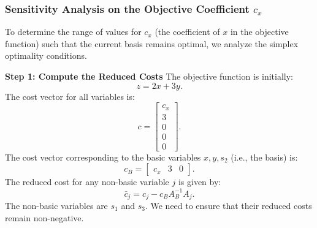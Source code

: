 \subsubsection{Sensitivity Analysis on the Objective Coefficient \(c_x\)}

To determine the range of values for \( c_x \) (the coefficient of \( x \) in the objective function) such that the current basis remains optimal, we analyze the simplex optimality conditions.

\textbf{Step 1: Compute the Reduced Costs}
The objective function is initially:
\[
    z = 2x + 3y.
\]
The cost vector for all variables is:
\[
    c = \begin{bmatrix} c_x \\ 3 \\ 0 \\ 0 \\ 0 \end{bmatrix}.
\]
The cost vector corresponding to the basic variables \( x, y, s_2 \) (i.e., the basis) is:
\[
    c_B = \begin{bmatrix} c_x & 3 & 0 \end{bmatrix}.
\]
The reduced cost for any non-basic variable \( j \) is given by:
\[
    \bar{c}_j = c_j - c_B A_B^{-1} A_j.
\]
The non-basic variables are \( s_1 \) and \( s_3 \). We need to ensure that their reduced costs remain non-negative.

